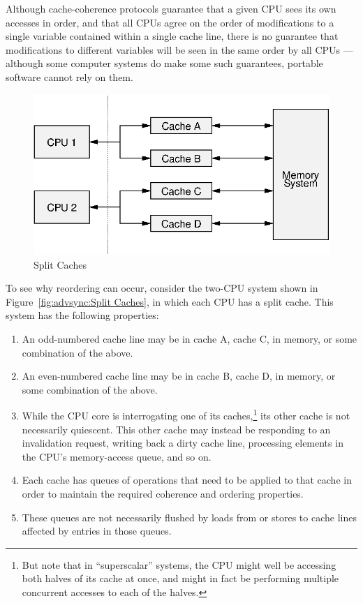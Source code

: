 Although cache-coherence protocols guarantee that a given CPU sees its
own accesses in order, and that all CPUs agree on the order of modifications
to a single variable contained within a single cache line, there is no
guarantee that modifications to different variables will be seen in
the same order by all CPUs --- although some computer systems do make
some such guarantees, portable software cannot rely on them.

\begin{figure}[htb]
\centering
\includegraphics{advsync/SplitCache}
\caption{Split Caches}
\end{figure}

To see why reordering can occur, consider the two-CPU system shown in
Figure~\ref{fig:advsync:Split Caches}, in which each CPU has a split
cache.
This system has the following properties:
\begin{enumerate}
\item	An odd-numbered cache line may be in cache A, cache C,
	in memory, or some combination of the above.
\item	An even-numbered cache line may be in cache B, cache D,
	in memory, or some combination of the above.
\item	While the CPU core is interrogating one of its caches,\footnote{
		But note that in ``superscalar'' systems, the CPU
		might well be accessing both halves of its cache at
		once, and might in fact be performing multiple concurrent
		accesses to each of the halves.}
	its other cache is not necessarily quiescent.
	This other cache may instead be responding to an invalidation
	request, writing back a dirty cache line,
	processing elements in the CPU's memory-access queue, and
	so on.
\item	Each cache has queues of operations that need to be applied
	to that cache in order to maintain the required coherence
	and ordering properties.
\item	These queues are not necessarily flushed by loads from or
	stores to cache lines affected by entries in those queues.
\end{enumerate}

